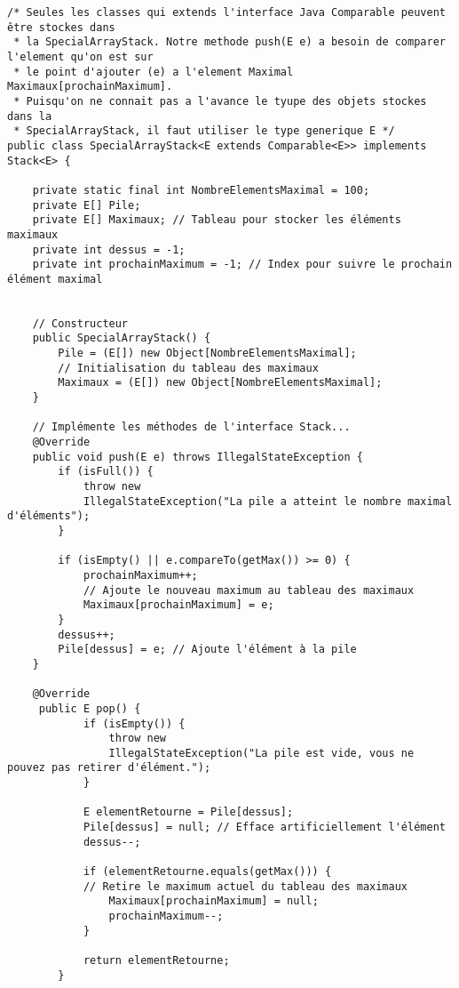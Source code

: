 \documentclass[10pt]{report}
\begin{document}
    \begin{lstlisting}[style=JavaDraculaWhite]
 /* Seules les classes qui extends l'interface Java Comparable peuvent être stockes dans 
 * la SpecialArrayStack. Notre methode push(E e) a besoin de comparer l'element qu'on est sur 
 * le point d'ajouter (e) a l'element Maximal  Maximaux[prochainMaximum]. 
 * Puisqu'on ne connait pas a l'avance le tyupe des objets stockes dans la 
 * SpecialArrayStack, il faut utiliser le type generique E */
public class SpecialArrayStack<E extends Comparable<E>> implements Stack<E> {   

    private static final int NombreElementsMaximal = 100;
    private E[] Pile;
    private E[] Maximaux; // Tableau pour stocker les éléments maximaux
    private int dessus = -1;
    private int prochainMaximum = -1; // Index pour suivre le prochain élément maximal


    // Constructeur
    public SpecialArrayStack() {
        Pile = (E[]) new Object[NombreElementsMaximal];
        // Initialisation du tableau des maximaux
        Maximaux = (E[]) new Object[NombreElementsMaximal]; 
    }

    // Implémente les méthodes de l'interface Stack...
    @Override
    public void push(E e) throws IllegalStateException {
        if (isFull()) {
            throw new 
            IllegalStateException("La pile a atteint le nombre maximal d'éléments");
        }
        
        if (isEmpty() || e.compareTo(getMax()) >= 0) {
            prochainMaximum++; 
            // Ajoute le nouveau maximum au tableau des maximaux
            Maximaux[prochainMaximum] = e;
        }
        dessus++;
        Pile[dessus] = e; // Ajoute l'élément à la pile
    }

    @Override
     public E pop() {
            if (isEmpty()) {
                throw new 
                IllegalStateException("La pile est vide, vous ne pouvez pas retirer d'élément.");
            }
            
            E elementRetourne = Pile[dessus];
            Pile[dessus] = null; // Efface artificiellement l'élément
            dessus--;
            
            if (elementRetourne.equals(getMax())) {
            // Retire le maximum actuel du tableau des maximaux
                Maximaux[prochainMaximum] = null; 
                prochainMaximum--;
            }
            
            return elementRetourne;
        }


\end{lstlisting}
\end{document}
